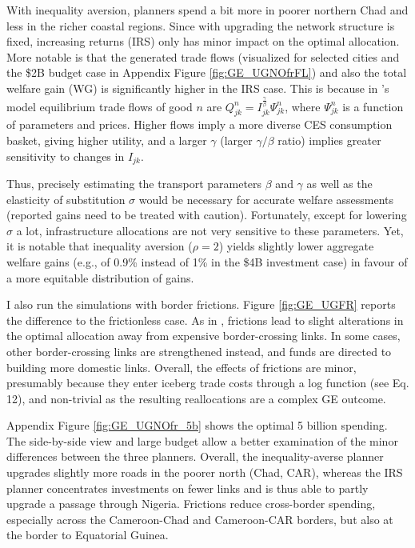 \documentclass[a4paper]{article}
\begin{document}
With inequality aversion, planners spend a bit more in poorer northern Chad and less in the richer coastal regions. Since with upgrading the network structure is fixed, increasing returns (IRS) only has minor impact on the optimal allocation. More notable is that the generated trade flows (visualized for selected cities and the \$2B budget case in Appendix Figure \ref{fig:GE_UGNOfrFL}) and also the total welfare gain (WG) is significantly higher in the IRS case. This is because in \citet{fajgelbaum2020optimal}'s model equilibrium trade flows of good $n$ are $Q^n_{jk} = I_{jk}^\frac{\gamma}{\beta}\Psi^n_{jk}$, where $\Psi^n_{jk}$ is a function of parameters and prices. Higher flows imply a more diverse CES consumption basket, giving higher utility, and a larger $\gamma$ (larger $\gamma/\beta$ ratio) implies greater sensitivity to changes in $I_{jk}$. \newline 

 Thus, precisely estimating the transport parameters $\beta$ and $\gamma$ as well as the elasticity of substitution $\sigma$ would be necessary for accurate welfare assessments (reported gains need to be treated with caution). Fortunately, except for lowering $\sigma$ a lot, infrastructure allocations are not very sensitive to these parameters. Yet, it is notable that inequality aversion ($\rho = 2$) yields slightly lower aggregate welfare gains (e.g., of 0.9\% instead of 1\% in the \$4B investment case) in favour of a more equitable distribution of gains.  \newline 

I also run the simulations with border frictions. Figure \ref{fig:GE_UGFR} reports the difference to the frictionless case. As in \citet{krantz2024optimal}, frictions lead to slight alterations in the optimal allocation away from expensive border-crossing links. In some cases, other border-crossing links are strengthened instead, and funds are directed to building more domestic links. Overall, the effects of frictions are minor, presumably because they enter iceberg trade costs through a log function (see \citet{krantz2024optimal} Eq. 12), and non-trivial as the resulting reallocations are a complex GE outcome. \newline 

Appendix Figure \ref{fig:GE_UGNOfr_5b} shows the optimal 5 billion spending. The side-by-side view and large budget allow a better examination of the minor differences between the three planners. Overall, the inequality-averse planner upgrades slightly more roads in the poorer north (Chad, CAR), whereas the IRS planner concentrates investments on fewer links and is thus able to partly upgrade a passage through Nigeria. Frictions reduce cross-border spending, especially across the Cameroon-Chad and Cameroon-CAR borders, but also at the border to Equatorial Guinea. 
\end{document}

